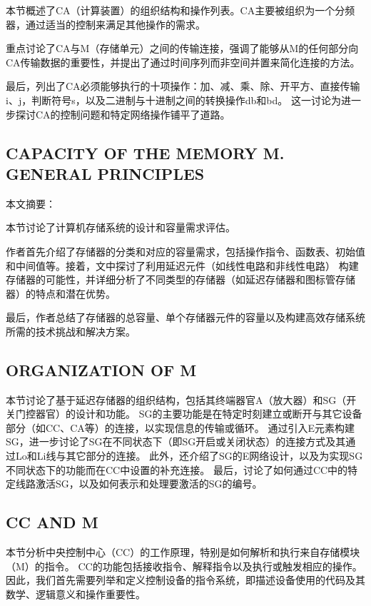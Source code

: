 \documentclass[12pt]{article} %
\theoremstyle{definition}
\begin{document}
本节概述了CA（计算装置）的组织结构和操作列表。CA主要被组织为一个分频器，通过适当的控制来满足其他操作的需求。

重点讨论了CA与M（存储单元）之间的传输连接，强调了能够从M的任何部分向CA传输数据的重要性，并提出了通过时间序列而非空间并置来简化连接的方法。

最后，列出了CA必须能够执行的十项操作：加、减、乘、除、开平方、直接传输i、j，判断符号s，以及二进制与十进制之间的转换操作db和bd。
这一讨论为进一步探讨CA的控制问题和特定网络操作铺平了道路。

\subsection{CAPACITY OF THE MEMORY M. GENERAL PRINCIPLES}

本文摘要：

本节讨论了计算机存储系统的设计和容量需求评估。

作者首先介绍了存储器的分类和对应的容量需求，包括操作指令、函数表、初始值和中间值等。接着，文中探讨了利用延迟元件（如线性电路和非线性电路）
构建存储器的可能性，并详细分析了不同类型的存储器（如延迟存储器和图标管存储器）的特点和潜在优势。

最后，作者总结了存储器的总容量、单个存储器元件的容量以及构建高效存储系统所需的技术挑战和解决方案。

\subsection{ORGANIZATION OF M}

本节讨论了基于延迟存储器的组织结构，包括其终端器官A（放大器）和SG（开关门控器官）的设计和功能。
SG的主要功能是在特定时刻建立或断开与其它设备部分（如CC、CA等）的连接，以实现信息的传输或循环。
通过引入E元素构建SG，进一步讨论了SG在不同状态下（即SG开启或关闭状态）的连接方式及其通过Lo和Li线与其它部分的连接。
此外，还介绍了SG的E网络设计，以及为实现SG不同状态下的功能而在CC中设置的补充连接。
最后，讨论了如何通过CC中的特定线路激活SG，以及如何表示和处理要激活的SG的编号。

\subsection{CC AND M}

本节分析中央控制中心（CC）的工作原理，特别是如何解析和执行来自存储模块（M）的指令。
CC的功能包括接收指令、解释指令以及执行或触发相应的操作。因此，我们首先需要列举和定义控制设备的指令系统，即描述设备使用的代码及其数学、逻辑意义和操作重要性。
\end{document}
